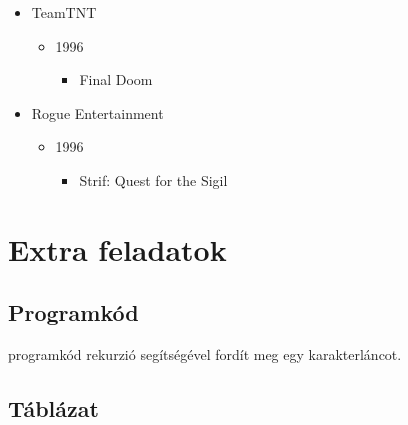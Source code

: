 \documentclass{thesis-ekf}
\theoremstyle{definition}
\theoremstyle{remark}
\begin{document}
\begin{itemize}
    \item TeamTNT
        \begin{itemize}
            \item 1996
                \begin{itemize}
                    \item Final Doom
                \end{itemize}
        \end{itemize}
    \item Rogue Entertainment
        \begin{itemize}
            \item 1996
                \begin{itemize}
                    \item Strif: Quest for the Sigil
                \end{itemize}
        \end{itemize}
\end{itemize}

\chapter{Extra feladatok}

\section{Programkód}


 programkód rekurzió segítségével fordít meg egy
karakterláncot.

\section{Táblázat}
\end{document}
